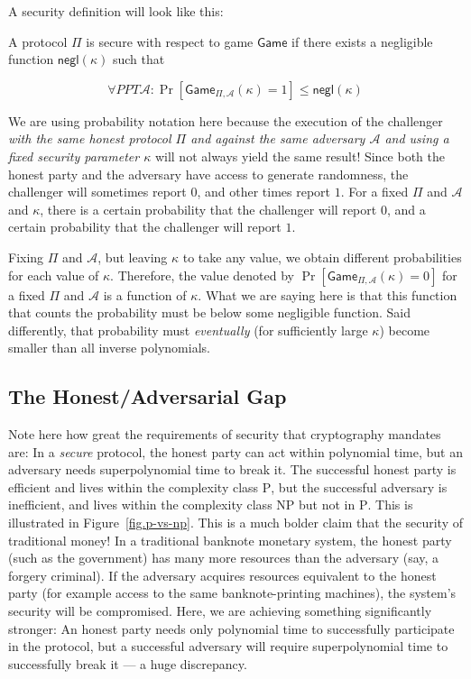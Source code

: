 A security definition will look like this:

\begin{definition}[Security]
  A protocol $\Pi$ is secure with respect to game $\textsf{Game}$ if there exists a negligible
  function $\textsf{negl}(\kappa)$ such that

  \[
    \forall PPT \mathcal{A}: \Pr[\textsf{Game}_{\Pi,\mathcal{A}}(\kappa) = 1] \leq \textsf{negl}(\kappa)
  \]
\end{definition}

We are using probability notation here because the execution of the challenger \emph{with the
same honest protocol $\Pi$ and against the same adversary $\mathcal{A}$ and using a fixed security parameter
$\kappa$} will not always yield
the same result! Since both the honest party and the adversary have access to generate randomness,
the challenger will sometimes report $0$, and other times report $1$. For a fixed $\Pi$ and $\mathcal{A}$
and $\kappa$, there is a certain probability that the challenger will report $0$, and a certain
probability that the challenger will report $1$.

Fixing $\Pi$ and $\mathcal{A}$, but leaving $\kappa$
to take any value, we obtain different probabilities for each value of $\kappa$. Therefore,
the value denoted by $\Pr[\textsf{Game}_{\Pi,\mathcal{A}}(\kappa) = 0]$ for a fixed $\Pi$ and
$\mathcal{A}$ is a function of $\kappa$. What we are saying here is that this function that
counts the probability must be below some negligible function. Said differently, that probability
must \emph{eventually} (for sufficiently large $\kappa$) become smaller than all inverse polynomials.

\subsection*{The Honest/Adversarial Gap}

Note here how great the requirements of security that cryptography mandates are:
In a \emph{secure} protocol, the honest party can act within polynomial time,
but an adversary needs superpolynomial time to break it. The successful honest party
is efficient and lives within the
complexity class \textsc{P}, but the successful adversary is inefficient, and
lives within the complexity class \textsc{NP} but not in \textsc{P}. This is
illustrated in Figure~\ref{fig.p-vs-np}. This is a much bolder claim that the
security of traditional money! In a traditional banknote monetary system, the honest party
(such as the government) has many more resources than the adversary (say, a forgery
criminal). If the adversary acquires resources equivalent to the honest party (for example
access to the same banknote-printing machines), the system's security will be
compromised. Here, we are achieving something significantly stronger: An honest
party needs only polynomial time to successfully participate in the protocol,
but a successful adversary will require superpolynomial time to successfully break it
--- a huge discrepancy.

